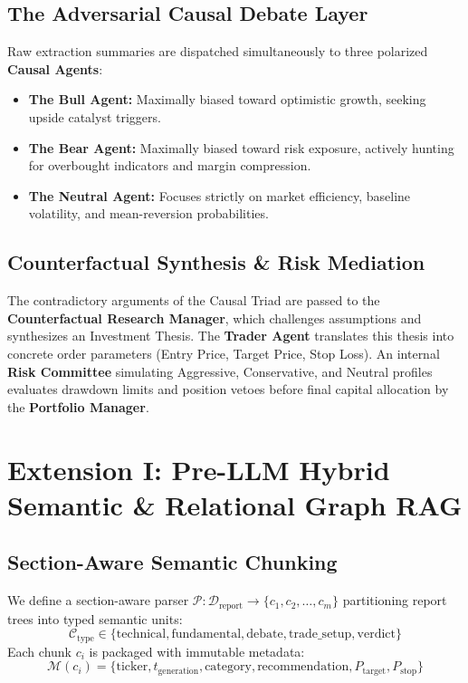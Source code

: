 \documentclass[conference]{IEEEtran}
\begin{document}
\subsection{The Adversarial Causal Debate Layer}
Raw extraction summaries are dispatched simultaneously to three polarized \textbf{Causal Agents}:
\begin{itemize}
    \item \textbf{The Bull Agent:} Maximally biased toward optimistic growth, seeking upside catalyst triggers.
    \item \textbf{The Bear Agent:} Maximally biased toward risk exposure, actively hunting for overbought indicators and margin compression.
    \item \textbf{The Neutral Agent:} Focuses strictly on market efficiency, baseline volatility, and mean-reversion probabilities.
\end{itemize}

\subsection{Counterfactual Synthesis \& Risk Mediation}
The contradictory arguments of the Causal Triad are passed to the \textbf{Counterfactual Research Manager}, which challenges assumptions and synthesizes an Investment Thesis. The \textbf{Trader Agent} translates this thesis into concrete order parameters (Entry Price, Target Price, Stop Loss). An internal \textbf{Risk Committee} simulating Aggressive, Conservative, and Neutral profiles evaluates drawdown limits and position vetoes before final capital allocation by the \textbf{Portfolio Manager}.

\section{Extension I: Pre-LLM Hybrid Semantic \& Relational Graph RAG}

\subsection{Section-Aware Semantic Chunking}
We define a section-aware parser $\mathcal{P}: \mathcal{D}_{\text{report}} \to \{c_1, c_2, \dots, c_m\}$ partitioning report trees into typed semantic units:
\begin{equation}
\mathcal{C}_{\text{type}} \in \{\text{technical}, \text{fundamental}, \text{debate}, \text{trade\_setup}, \text{verdict}\}
\end{equation}
Each chunk $c_i$ is packaged with immutable metadata:
\begin{equation}
\mathcal{M}(c_i) = \{\text{ticker}, t_{\text{generation}}, \text{category}, \text{recommendation}, P_{\text{target}}, P_{\text{stop}}\}
\end{equation}
\end{document}
